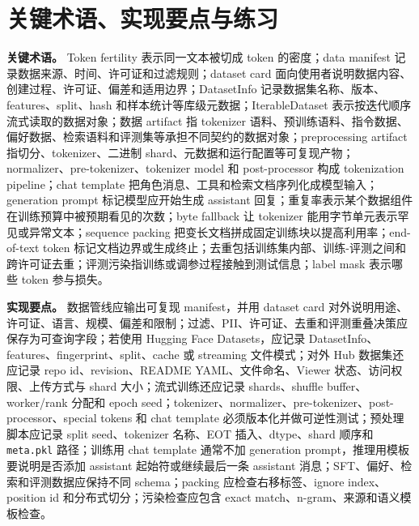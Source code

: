 \documentclass[UTF8,zihao=-4,openany]{ctexbook}
\begin{document}
\section{关键术语、实现要点与练习}
\textbf{关键术语。} Token fertility 表示同一文本被切成 token 的密度；data manifest 记录数据来源、时间、许可证和过滤规则；dataset card 面向使用者说明数据内容、创建过程、许可证、偏差和适用边界；DatasetInfo 记录数据集名称、版本、features、split、hash 和样本统计等库级元数据；IterableDataset 表示按迭代顺序流式读取的数据对象；数据 artifact 指 tokenizer 语料、预训练语料、指令数据、偏好数据、检索语料和评测集等承担不同契约的数据对象；preprocessing artifact 指切分、tokenizer、二进制 shard、元数据和运行配置等可复现产物；normalizer、pre-tokenizer、tokenizer model 和 post-processor 构成 tokenization pipeline；chat template 把角色消息、工具和检索文档序列化成模型输入；generation prompt 标记模型应开始生成 assistant 回复；重复率表示某个数据组件在训练预算中被预期看见的次数；byte fallback 让 tokenizer 能用字节单元表示罕见或异常文本；sequence packing 把变长文档拼成固定训练块以提高利用率；end-of-text token 标记文档边界或生成终止；去重包括训练集内部、训练-评测之间和跨许可证去重；评测污染指训练或调参过程接触到测试信息；label mask 表示哪些 token 参与损失。

\textbf{实现要点。} 数据管线应输出可复现 manifest，并用 dataset card 对外说明用途、许可证、语言、规模、偏差和限制；过滤、PII、许可证、去重和评测重叠决策应保存为可查询字段；若使用 Hugging Face Datasets，应记录 DatasetInfo、features、fingerprint、split、cache 或 streaming 文件模式；对外 Hub 数据集还应记录 repo id、revision、README YAML、文件命名、Viewer 状态、访问权限、上传方式与 shard 大小；流式训练还应记录 shards、shuffle buffer、worker/rank 分配和 epoch seed；tokenizer、normalizer、pre-tokenizer、post-processor、special tokens 和 chat template 必须版本化并做可逆性测试；预处理脚本应记录 split seed、tokenizer 名称、EOT 插入、dtype、shard 顺序和 \texttt{meta.pkl} 路径；训练用 chat template 通常不加 generation prompt，推理用模板要说明是否添加 assistant 起始符或继续最后一条 assistant 消息；SFT、偏好、检索和评测数据应保持不同 schema；packing 应检查右移标签、ignore index、position id 和分布式切分；污染检查应包含 exact match、n-gram、来源和语义模板检查。
\end{document}
